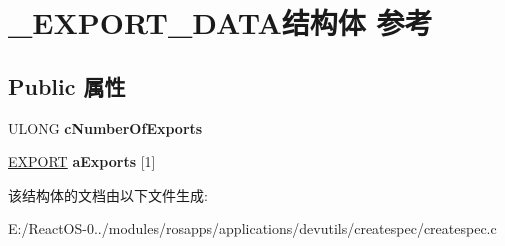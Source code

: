 \hypertarget{struct___e_x_p_o_r_t___d_a_t_a}{}\section{\+\_\+\+E\+X\+P\+O\+R\+T\+\_\+\+D\+A\+T\+A结构体 参考}
\label{struct___e_x_p_o_r_t___d_a_t_a}
\subsection*{Public 属性}
\begin{DoxyCompactItemize}
\item 
\mbox{\label{struct___e_x_p_o_r_t___d_a_t_a_ad8a767b2b6f604b10b4410173b76ae5c}} 
U\+L\+O\+NG {\bfseries c\+Number\+Of\+Exports}
\item 
\mbox{\label{struct___e_x_p_o_r_t___d_a_t_a_a5ff428a5b1fb0f3414b484dd01762962}} 
\hyperlink{struct_e_x_p_o_r_t}{E\+X\+P\+O\+RT} {\bfseries a\+Exports} \mbox{[}1\mbox{]}
\end{DoxyCompactItemize}


该结构体的文档由以下文件生成\+:\begin{DoxyCompactItemize}
\item 
E\+:/\+React\+O\+S-\/0../modules/rosapps/applications/devutils/createspec/createspec.\+c\end{DoxyCompactItemize}
